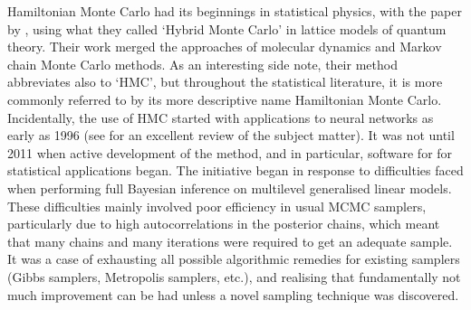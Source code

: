 \label{misc:hmc}

Hamiltonian Monte Carlo had its beginnings in statistical physics, with the \citeyear{duane1987hybrid} paper by \citeauthor{duane1987hybrid}, using what they called `Hybrid Monte Carlo' in lattice models of quantum theory.
Their work merged the approaches of molecular dynamics and Markov chain Monte Carlo methods.
As an interesting side note, their method abbreviates also to `HMC', but throughout the statistical literature, it is more commonly referred to by its more descriptive name Hamiltonian Monte Carlo.
Incidentally, the use of HMC started with applications to neural networks as early as 1996 (see \cite{neal2011mcmc} for an excellent review of the subject matter).
It was not until 2011 when active development of the method, and in particular, software for for statistical applications began.
The  initiative \citep{carpenter2016stan} began in response to difficulties faced when performing full Bayesian inference on multilevel generalised linear models.
These difficulties mainly involved poor efficiency in usual MCMC samplers, particularly due to high autocorrelations in the posterior chains, which meant that many chains and many iterations were required to get an adequate sample.
It was a case of exhausting all possible algorithmic remedies for existing samplers (Gibbs samplers, Metropolis samplers, etc.), and realising that fundamentally not much improvement can be had unless a novel sampling technique was discovered.

